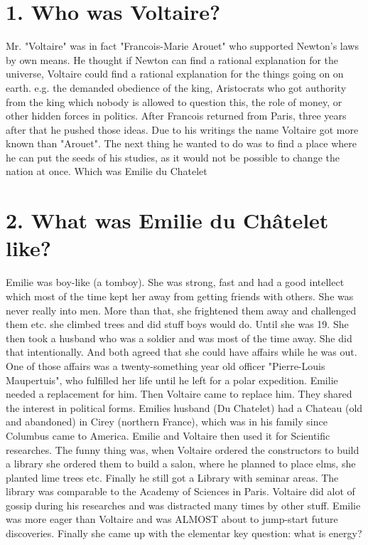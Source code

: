 %

\section{1. Who was Voltaire?}
Mr. "Voltaire" was in fact "Francois-Marie Arouet" who supported Newton's laws by own means.
He thought if Newton can find a rational explanation for the universe, Voltaire
could find a rational explanation for the things going on on earth. e.g. the demanded
obedience of the king, Aristocrats who got authority from the king which nobody is allowed
to question this, the role of money, or other hidden forces in politics. After Francois
returned from Paris, three years after that he pushed those ideas. Due to his writings
the name Voltaire got more known than "Arouet".
The next thing he wanted to do was to find a place where he can put the seeds of
his studies, as it would not be possible to change the nation at once. Which was
Emilie du Chatelet

\section{2. What was Emilie du Châtelet like?}
Emilie was boy-like (a tomboy). She was strong, fast and had a good intellect
which most of the time kept her away from getting friends with others.
She was never really into men. More than that,
she frightened them away and challenged them etc. she climbed trees and did stuff boys
would do. Until she was 19. She then took a husband who was a soldier and was most
of the time away. She did that intentionally. And both agreed that she could have
affairs while he was out. One of those affairs was a twenty-something year old officer
"Pierre-Louis Maupertuis", who fulfilled her life until he left for a polar expedition.
Emilie needed a replacement for him. Then Voltaire came to replace him.
They shared the interest in political forms. Emilies husband (Du Chatelet) had a 
Chateau (old and abandoned) in Cirey (northern France), which was in his family since
Columbus came to America. Emilie and Voltaire then used it for Scientific researches.
The funny thing was, when Voltaire ordered the constructors to build a library
she ordered them to build a salon, where he planned to place elms, she planted lime
trees etc. Finally he still got a Library with seminar areas. The library was 
comparable to the Academy of Sciences in Paris.
Voltaire did alot of gossip during his researches and was distracted many times by
other stuff.
Emilie was more eager than Voltaire and was ALMOST about to jump-start future discoveries.
Finally she came up with the elementar key question: what is energy?


